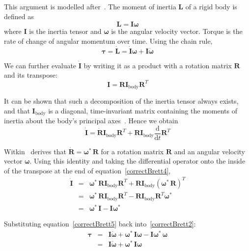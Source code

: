 This argument is modelled after~\cite{Ruf:02}. The moment of inertia $\mathbf{L}$ of a rigid
body is defined as
\begin{equation}
\label{correctBrett1}
\mathbf{L} = \mathbf{I}\bm{\omega}
\end{equation}
where $\mathbf{I}$ is the inertia tensor and $\bm{\omega}$ is the angular velocity vector.
Torque is the rate of change of angular momentum over time. Using the chain rule,
\begin{equation}
\label{correctBrett2}
\bm{\tau} = \dot{\mathbf{L}} = \dot{\mathbf{I}}\bm{\omega} + \mathbf{I}\dot{\bm{\omega}}
\end{equation}

We can further evaluate $\dot{\mathbf{I}}$ by writing it as a product with a rotation matrix
$\mathbf{R}$ and its transpose:
\begin{equation}
\label{correctBrett3}
\mathbf{I} = \mathbf{RI}_\mathrm{body}\mathbf{R}^T
\end{equation}

It can be shown that such a decomposition of the inertia tensor always exists, and that
$\mathbf{I}_\mathrm{body}$ is a diagonal, time-invariant matrix containing the moments
of inertia about the body's principal axes~\cite{Feynman:63}. Hence we obtain
\begin{equation}
\label{correctBrett4}
\dot{\mathbf{I}} = \dot{\mathbf{R}}\mathbf{I}_\mathrm{body}\mathbf{R}^T +
    \mathbf{RI}_\mathrm{body}\frac{\mathrm{d}}{\mathrm{d}t}\mathbf{R}^T
\end{equation}

Witkin~\cite{BaraffWitkin:97} derives that $\dot{\mathbf{R}} = \bm{\omega}^*\,\mathbf{R}$
for a rotation matrix $\mathbf{R}$ and an angular velocity vector $\bm{\omega}$.
Using this identity and taking the differential operator onto the inside of the
transpose at the end of equation~\ref{correctBrett4},
\begin{eqnarray}
\dot{\mathbf{I}} &=& \bm{\omega}^*\,\mathbf{RI}_\mathrm{body}\mathbf{R}^T +
    \mathbf{RI}_\mathrm{body}(\bm{\omega}^*\,\mathbf{R})^T \nonumber\\
&=& \bm{\omega}^*\,\mathbf{RI}_\mathrm{body}\mathbf{R}^T -
    \mathbf{RI}_\mathrm{body}\mathbf{R}^T\bm{\omega}^* \nonumber\\
&=& \bm{\omega}^*\,\mathbf{I} - \mathbf{I}\bm{\omega}^* \label{correctBrett5}
\end{eqnarray}

Substituting equation~\ref{correctBrett5} back into~\ref{correctBrett2}:
\begin{eqnarray}
\bm{\tau} & = & \mathbf{I}\dot{\bm{\omega}} + \bm{\omega}^*\,\mathbf{I}\bm{\omega} -
    \mathbf{I}\bm{\omega}^*\,\bm{\omega} \nonumber \\
& = & \mathbf{I}\dot{\bm{\omega}} + \bm{\omega}^*\,\mathbf{I}\bm{\omega} \label{correctBrett6}
\end{eqnarray}

